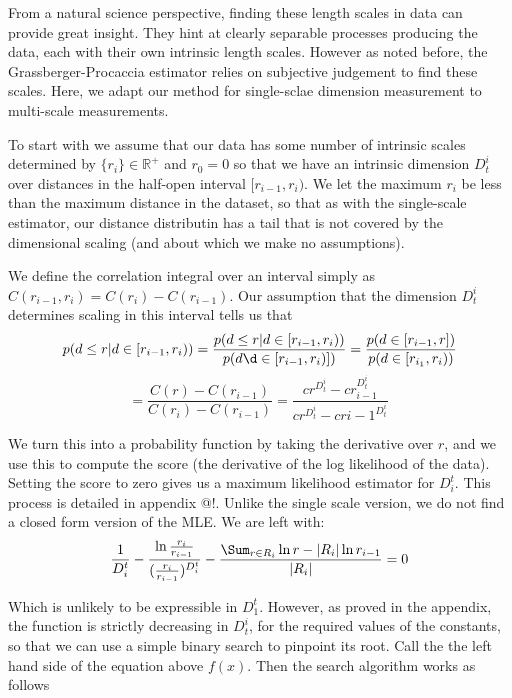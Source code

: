 \documentclass{article}
\begin{document}
From a natural science perspective, finding these length scales in data can provide great insight. They hint at clearly separable processes producing the data, each with their own intrinsic length scales. However as noted before, the Grassberger-Procaccia estimator relies on subjective judgement to find these scales. Here, we adapt our method for single-sclae dimension measurement to multi-scale measurements.

To start with we assume that our data has some number of intrinsic scales determined by $\{r_i\} \in {\mathbb R}^+$ and $r_0 = 0$ so that we have an intrinsic dimension $D_t^i$ over distances in the half-open interval $[r_{i-1}, r_{i})$. We let the maximum $r_i$ be less than the maximum distance in the dataset, so that as with the single-scale estimator, our distance distributin has a tail that is not covered by the dimensional scaling (and about which we make no assumptions).

We define the correlation integral over an interval simply as $C(r_{i-1}, r_i) = C(r_i) - C(r_{i-1})$. Our assumption that the dimension $D_t^i$ determines scaling in this interval tells us that 
\[
p(d \leq r | d \in [r_{i-1}, r_i)) = \frac{p(d \leq r | d \in [r_{i-1}, r_i))}{p(d \d \in [r_{i-1}, r_i)])} = \frac{p(d \in [r_{i-1}, r])}{p(d \in [r_{i_1}, r_i))}
\]
\[
 = \frac{C(r) - C(r_{i-1})}{C(r_i) - C(r_{i-1})} = \frac{cr^{D^i_t} - cr_{i-1}^{D^i_t}}{cr^{D^i_t} - cr{i-1}^{D^i_t}}\
\]

We turn this into a probability function by taking the derivative over $r$, and we use this to compute the score (the derivative of the log likelihood of the data). Setting the score to zero gives us a maximum likelihood estimator for $D^t_i$. This process is detailed in appendix @!. Unlike the single scale version, we do not find a closed form version of the MLE. We are left with:
\[
\frac{1}{D^t_i} - \frac{\ln \frac{r_i}{r_{i-1}}}{(\frac{r_i}{r_{i-1}})^{D^t_i}} - \frac{\Sum_{r \in R_i}\ln r - |R_i| \ln r_{i-1}}{|R_i|} = 0
\]

Which is unlikely to be expressible in $D^t_1$. However, as proved in the appendix, the function is strictly decreasing in $D^i_t$, for the required values of the constants, so that we can use a simple binary search to pinpoint its root. Call the the left hand side of the equation above $f(x)$. Then the search algorithm works as follows
\end{document}

